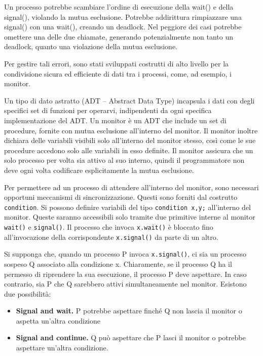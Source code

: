 \documentclass[a4]{article}
\begin{document}
Un processo potrebbe scambiare l'ordine di esecuzione della wait() e della signal(), violando la mutua esclusione. Potrebbe addirittura rimpiazzare una signal() con una wait(), creando un deadlock. Nel peggiore dei casi potrebbe omettere una delle due chiamate, generando potenzialmente non tanto un deadlock, quanto una violazione della mutua esclusione.

Per gestire tali errori, sono stati sviluppati costrutti di alto livello per la condivisione sicura ed efficiente di dati tra i processi, come, ad esempio, i monitor.

Un tipo di dato astratto (ADT -- Abstract Data Type) incapsula i dati con degli specifici set di funzioni per operarvi, indipendenti da ogni specifica implementazione del ADT. Un monitor è un ADT che include un set di procedure, fornite con mutua esclusione all'interno del monitor. Il monitor inoltre dichiara delle variabili visibili solo all'interno del monitor stesso, così come le sue procedure accedono solo alle variabili in esso definite.\newline
Il monitor assicura che un solo processo per volta sia attivo al suo interno, quindi il programmatore non deve ogni volta codificare esplicitamente la mutua esclusione.

Per permettere ad un processo di attendere all'interno del monitor, sono necessari opportuni meccanismi di sincronizzazione. Questi sono forniti dal costrutto \texttt{condition}. Si possono definire variabili del tipo \texttt{condition x,y;} all'interno del monitor. Queste saranno accessibili solo tramite due primitive interne al monitor \texttt{wait()} e \texttt{signal()}. Il processo che invoca \texttt{x.wait()} è bloccato fino all'invocazione della corrispondente \texttt{x.signal()} da parte di un altro.

Si supponga che, quando un processo P invoca \texttt{x.signal()}, ci sia un processo sospeso Q associato alla condizione x. Chiaramente, se il processo Q ha il permesso di riprendere la sua esecuzione, il processo P deve aspettare. In caso contrario, sia P che Q sarebbero attivi simultaneamente nel monitor. Esistono due possibilità:
\begin{itemize}
    \item \textbf{Signal and wait.} P potrebbe aspettare finché Q non lascia il monitor o aspetta un'altra condizione
    \item \textbf{Signal and continue.} Q può aspettare che P lasci il monitor o potrebbe aspettare un'altra condizione.
\end{itemize}
\end{document}
